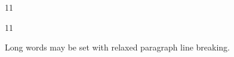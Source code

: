 \documentclass[paper=A4]{ropas-poster}
\begin{document}
\begin{postergrid}{1}{1}
\begin{posterblock}{1}{1}
\begin{sloppypar}Long words may be set with relaxed paragraph line breaking.\end{sloppypar}
\end{posterblock}
\end{postergrid}
\end{document}

